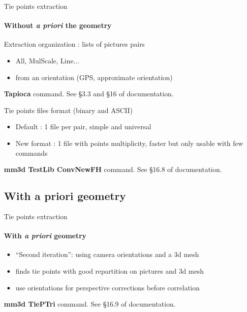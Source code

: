 \documentclass{beamer}
\begin{document}
        \begin{frame}{Tie points extraction }
                \framesubtitle{Without \textit{a priori} the geometry}   
\pause
                \begin{block}{Extraction organization : lists of pictures pairs}
                \begin{itemize}
                        \item All, MulScale, Line...
                        \item from an orientation (GPS, approximate orientation)
                \end{itemize}
                \end{block}
                \textbf{Tapioca} command. See §3.3 and §16 of documentation.
\pause
                \begin{block}{Tie points files format (binary and ASCII)}
                \begin{itemize}
                        \item Default : 1 file per pair, simple and universal
                        \item New format : 1 file with points multiplicity, faster but only usable with few commands
                \end{itemize}
                \end{block}
                \textbf{mm3d TestLib ConvNewFH} command. See §16.8 of documentation.
        \end{frame}

\subsection{With a priori geometry}   
        \begin{frame}{Tie points extraction}
\pause
                \framesubtitle{With \textit{a priori} geometry}
                \begin{itemize}
                        \item ``Second iteration'': using camera orientations and a 3d mesh
                        \item finds tie points with good repartition on pictures and 3d mesh
                        \item use orientations for perspective corrections before correlation
                \end{itemize}
                \textbf{mm3d TiePTri} command. See §16.9 of documentation.
                
        \end{frame}
\end{document}
